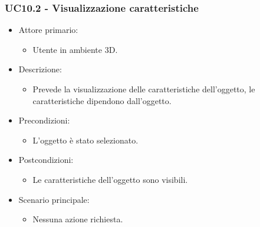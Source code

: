 \subsubsection{UC10.2 - Visualizzazione caratteristiche}
\begin{itemize}
	
	\item Attore primario: 
	\begin{itemize}
		\item Utente in ambiente 3D.
	\end{itemize}
	\item Descrizione:
	\begin{itemize}
		\item Prevede la visualizzazione delle caratteristiche dell'oggetto, le caratteristiche dipendono dall'oggetto.
	\end{itemize}
	
	\item Precondizioni:
	\begin{itemize}
		\item L'oggetto è stato selezionato.
	\end{itemize}
	
	\item Postcondizioni:
	\begin{itemize}
		\item Le caratteristiche dell'oggetto sono visibili.
	\end{itemize}
	
	\item Scenario principale:
	\begin{itemize}
		\item Nessuna azione richiesta.
	\end{itemize}
	
\end{itemize}

\pagebreak

